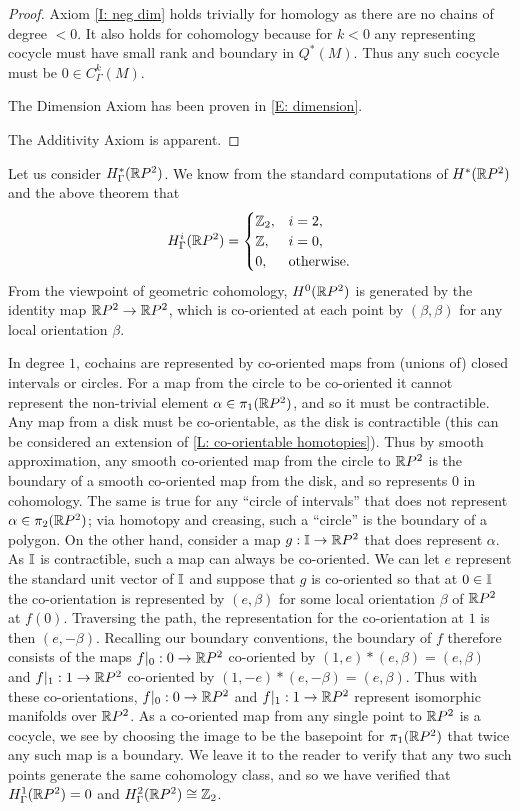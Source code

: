 \begin{proof}
Axiom \ref{I: neg dim} holds trivially for homology as there are no chains of degree $<0$. It also holds for cohomology because for $k<0$ any representing cocycle must have small rank and boundary in $Q^*(M)$. Thus any such cocycle must be $0 \in C^k_\Gamma(M)$.

The Dimension Axiom has been proven in \cref{E: dimension}.

The Additivity Axiom is apparent.
\end{proof}


\begin{example}
Let us consider $H^*_\Gamma(\mathbb{R} P^2)$. We know from the standard computations of $H^*(\mathbb{R} P^2)$ and the above theorem that
\begin{equation*}
H_\Gamma^i(\mathbb{R} P^2) =
\begin{cases}
\mathbb{Z}_2,&i = 2,\\
\mathbb{Z},&i = 0,\\
0,&\text{otherwise.}
\end{cases}
\end{equation*}
From the viewpoint of geometric cohomology, $H^0(\mathbb{R} P^2)$ is generated by the identity map $\mathbb{R} P^2 \to \mathbb{R} P^2$, which is co-oriented at each point by $(\beta,\beta)$ for any local orientation $\beta$.

In degree $1$, cochains are represented by co-oriented maps from (unions of) closed intervals or circles. For a map from the circle to be co-oriented it cannot represent the non-trivial element $\alpha \in \pi_1(\mathbb{R} P^2)$, and so it must be contractible. Any map from a disk must be co-orientable, as the disk is contractible (this can be considered an extension of \cref{L: co-orientable homotopies}). Thus by smooth approximation, any smooth co-oriented map from the circle to $\mathbb{R} P^2$ is the boundary of a smooth co-oriented map from the disk, and so represents $0$ in cohomology. The same is true for any ``circle of intervals'' that does not represent $\alpha \in \pi_2(\mathbb{R} P^2)$; via homotopy and creasing, such a ``circle'' is the boundary of a polygon. On the other hand, consider a map $g:\mathbb{I} \to \mathbb{R} P^2$ that does represent $\alpha$. As $\mathbb{I}$ is contractible, such a map can always be co-oriented. We can let $e$ represent the standard unit vector of $\mathbb{I}$ and suppose that $g$ is co-oriented so that at $0 \in \mathbb{I}$ the co-orientation is represented by $(e,\beta)$ for some local orientation $\beta$ of $\mathbb{R} P^2$ at $f(0)$. Traversing the path, the representation for the co-orientation at $1$ is then $(e,-\beta)$. Recalling our boundary conventions, the boundary of $f$ therefore consists of the maps $f|_0:0 \to \mathbb{R} P^2$ co-oriented by $(1,e)*(e,\beta) = (e,\beta)$ and $f|_1:1 \to \mathbb{R} P^2$ co-oriented by $(1,-e)*(e,-\beta) = (e,\beta)$. Thus with these co-orientations, $f|_0:0 \to \mathbb{R} P^2$ and $f|_1:1 \to \mathbb{R} P^2$ represent isomorphic manifolds over $\mathbb{R} P^2$. As a co-oriented map from any single point to $\mathbb{R} P^2$ is a cocycle, we see by choosing the image to be the basepoint for $\pi_1(\mathbb{R} P^2)$ that twice any such map is a boundary. We leave it to the reader to verify that any two such points generate the same cohomology class, and so we have verified that $H^1_\Gamma(\mathbb{R} P^2) = 0$ and $H_\Gamma^2(\mathbb{R} P^2)\cong \mathbb{Z}_2$.
\end{example}

